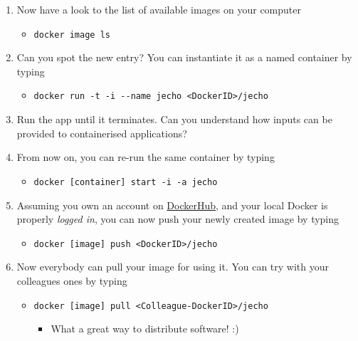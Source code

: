 \documentclass[presentation]{beamer}\mode<presentation>{\usetheme{AMSBolognaFC}}
\begin{document}
\begin{frame}[allowframebreaks]
\begin{enumerate}
        \item Now have a look to the list of available images on your computer
        \begin{itemize}
            \item[\$] \texttt{docker image ls}
        \end{itemize}

        \item Can you spot the new entry? You can instantiate it as a \alert{named} container by typing
        \begin{itemize}
            \item[\$] \texttt{docker run -t -i \alert{{-}-name jecho} <DockerID>/jecho}
        \end{itemize}

        \item Run the app until it terminates. Can you understand how inputs can be provided to containerised applications?

        \framebreak

        \item From now on, you can re-run the \alert{same} container by typing
        \begin{itemize}
            \item[\$] \texttt{docker [container] \alert{start} -i -a jecho}
        \end{itemize}

        \item Assuming you own an account on \href{https://hub.docker.com/}{DockerHub}, and your local Docker is properly \emph{logged in}, you can now \alert{push} your newly created image by typing
        \begin{itemize}
            \item[\$] \texttt{docker [image] \alert{push} <DockerID>/jecho}
        \end{itemize}

        \item Now everybody can \alert{pull} your image for using it. You can try with your colleagues ones by typing
        \begin{itemize}
            \item[\$] \texttt{docker [image] \alert{pull} <Colleague-DockerID>/jecho}
            \begin{itemize}
                \item What a great way to distribute software! :)
            \end{itemize}
        \end{itemize}

    \end{enumerate}

\end{frame}
\end{document}
